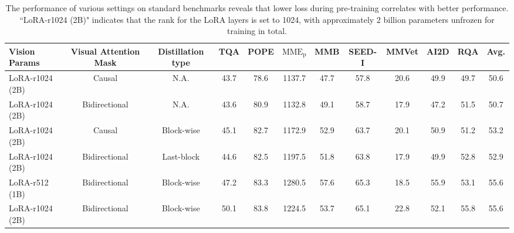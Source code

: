 \begin{table}[h]
    \centering
    \renewcommand{\arraystretch}{1.5} %
    \setlength{\tabcolsep}{3.5pt} %
    \small
    \begin{tabular}{l|c|c|cccccccc|c}
    \toprule
    Vision Params & Visual Attention Mask & Distillation type & TQA & POPE & $\mathrm{MME_p}$ & MMB & SEED-I & MMVet & AI2D & RQA & Avg.\\ 
    \midrule
    LoRA-r1024 (2B) & Causal & N.A. & 43.7 & 78.6 & 1137.7 & 47.7 & 57.8 & 20.6 & 49.9 & 49.7 & 50.6 \\
    LoRA-r1024 (2B) & Bidirectional & N.A. & 43.6 & 80.9 & 1132.8 & 49.1 & 58.7 & 17.9 & 47.2 & 51.5 & 50.7 \\
    LoRA-r1024 (2B) & Causal & Block-wise & 45.1 & 82.7 & 1172.9 & 52.9 & 63.7 & 20.1 & 50.9 & 51.2 & 53.2 \\
    LoRA-r1024 (2B) & Bidirectional & Last-block & 44.6 & 82.5 & 1197.5 & 51.8 & 63.8 & 17.9 & 49.9 & 52.8 & 52.9 \\
    LoRA-r512 (1B) & Bidirectional & Block-wise & 47.2 & 83.3 & 1280.5 & 57.6 & 65.3 & 18.5 & 55.9 & 53.1 & 55.6 \\
    LoRA-r1024 (2B) & Bidirectional & Block-wise & 50.1 & 83.8 & 1224.5 & 53.7 & 65.1 & 22.8 & 52.1 & 55.8 & 55.6 \\
    \bottomrule
    \end{tabular}
    \caption{The performance of various settings on standard benchmarks reveals that lower loss during pre-training correlates with better performance. ``LoRA-r1024 (2B)" indicates that the rank for the LoRA layers is set to 1024, with approximately 2 billion parameters unfrozen for training in total.}
    \label{tab:ablation}
\end{table}
